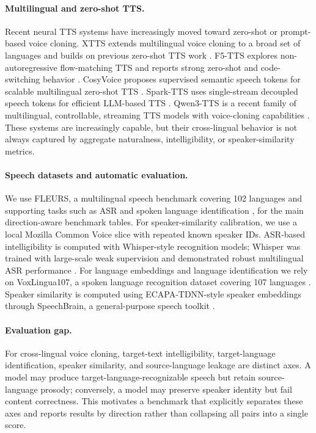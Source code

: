 \documentclass[11pt]{article}
\begin{document}
\paragraph{Multilingual and zero-shot TTS.}
Recent neural TTS systems have increasingly moved toward zero-shot or prompt-based voice cloning. XTTS extends multilingual voice cloning to a broad set of languages and builds on previous zero-shot TTS work \cite{casanova2024xtts}. F5-TTS explores non-autoregressive flow-matching TTS and reports strong zero-shot and code-switching behavior \cite{chen2024f5tts}. CosyVoice proposes supervised semantic speech tokens for scalable multilingual zero-shot TTS \cite{du2024cosyvoice}. Spark-TTS uses single-stream decoupled speech tokens for efficient LLM-based TTS \cite{wang2025sparktts}. Qwen3-TTS is a recent family of multilingual, controllable, streaming TTS models with voice-cloning capabilities \cite{hu2026qwen3tts}. These systems are increasingly capable, but their cross-lingual behavior is not always captured by aggregate naturalness, intelligibility, or speaker-similarity metrics.

\paragraph{Speech datasets and automatic evaluation.}
We use FLEURS, a multilingual speech benchmark covering 102 languages and supporting tasks such as ASR and spoken language identification \cite{conneau2022fleurs}, for the main direction-aware benchmark tables. For speaker-similarity calibration, we use a local Mozilla Common Voice slice with repeated known speaker IDs. ASR-based intelligibility is computed with Whisper-style recognition models; Whisper was trained with large-scale weak supervision and demonstrated robust multilingual ASR performance \cite{radford2023whisper}. For language embeddings and language identification we rely on VoxLingua107, a spoken language recognition dataset covering 107 languages \cite{valk2021voxlingua107}. Speaker similarity is computed using ECAPA-TDNN-style speaker embeddings \cite{desplanques2020ecapa} through SpeechBrain, a general-purpose speech toolkit \cite{ravanelli2021speechbrain}.

\paragraph{Evaluation gap.}
For cross-lingual voice cloning, target-text intelligibility, target-language identification, speaker similarity, and source-language leakage are distinct axes. A model may produce target-language-recognizable speech but retain source-language prosody; conversely, a model may preserve speaker identity but fail content correctness. This motivates a benchmark that explicitly separates these axes and reports results by direction rather than collapsing all pairs into a single score.
\end{document}

